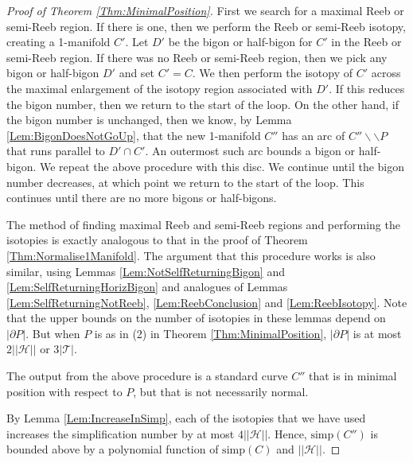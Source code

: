 \documentclass[oneside]{amsart}
\numberwithin{equation}{section}
\theoremstyle{plain}
\theoremstyle{definition}
\newcommand{\calT}{{\mathcal{T}}}
\newcommand{\cut}{\backslash\backslash}
\newcommand{\calH}{\mathcal{H}}
\begin{document}
\begin{proof}[Proof of Theorem \ref{Thm:MinimalPosition}] 
First we search for a maximal Reeb or semi-Reeb region. If there is one, then we perform the Reeb or semi-Reeb isotopy, creating a 1-manifold $C'$. Let $D'$ be the bigon or half-bigon for $C'$ in the Reeb or semi-Reeb region. If there was no Reeb or semi-Reeb region, then we pick any bigon or half-bigon $D'$ and set $C' = C$. We then perform the isotopy of $C'$ across the maximal enlargement of the isotopy region associated with $D'$. If this reduces the bigon number, then we return to the start of the loop. On the other hand, if the bigon number is unchanged, then we know, by Lemma \ref{Lem:BigonDoesNotGoUp}, that the new 1-manifold $C''$ has an arc of $C'' \cut P$ that runs parallel to $D' \cap C'$. An outermost such arc bounds a bigon or half-bigon. We repeat the above procedure with this disc. We continue until the bigon number decreases, at which point we return to the start of the loop. This continues until there are no more bigons or half-bigons.

The method of finding maximal Reeb and semi-Reeb regions and performing the isotopies is exactly analogous to that in the proof of Theorem \ref{Thm:Normalise1Manifold}. The argument that this procedure works is also similar, using Lemmas \ref{Lem:NotSelfReturningBigon} and \ref{Lem:SelfReturningHorizBigon} and analogues of Lemmas \ref{Lem:SelfReturningNotReeb}, \ref{Lem:ReebConclusion} and \ref{Lem:ReebIsotopy}. Note that the upper bounds on the number of isotopies in these lemmas depend on $|\partial P|$. But when $P$ is as in (2) in Theorem \ref{Thm:MinimalPosition}, $|\partial P|$ is at most $2||\calH||$ or $3|\calT|$.

The output from the above procedure is a standard curve $C''$ that is in minimal position with respect to $P$, but that is not necessarily normal. 

By Lemma \ref{Lem:IncreaseInSimp}, each of the isotopies that we have used increases the simplification number by at most $4||\calH||$. Hence, $\mathrm{simp}(C'')$ is bounded above by a polynomial function of $\mathrm{simp}(C)$ and $||\calH||$. 


\end{proof}
\end{document}
